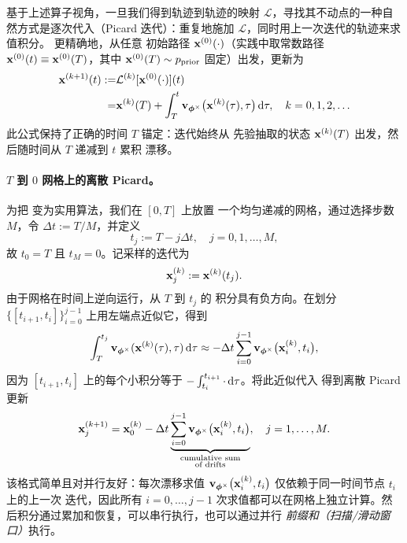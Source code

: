 基于上述算子视角，一旦我们得到轨迹到轨迹的映射
$\mathcal{L}$，寻找其不动点的一种自然方式是逐次代入（Picard 迭代）：重复地施加 $\mathcal{L}$，同时用上一次迭代的轨迹来求值积分。
更精确地，从任意
初始路径 ${\mathbf{x}}^{(0)}(\cdot)$（实践中取常数路径
${\mathbf{x}}^{(0)}(t)\equiv {\mathbf{x}}^{(0)}(T)$，其中 ${\mathbf{x}}^{(0)}(T)\sim p_{\mathrm{prior}}$ 固定）出发，更新为
\begin{align}\label{eq:picard_iter_T_to_t}
    \begin{aligned}
    {\mathbf{x}}^{(k+1)}(t)
    := &\mathcal{L}^{(k)}[{\mathbf{x}}^{(0)}(\cdot)](t)
    \\=
    &{\mathbf{x}}^{(k)}(T)
    +\int_{T}^{t}
    {\mathbf{v}}_{{\bm{\phi}}^\times} \big({\mathbf{x}}^{(k)}(\tau),\tau\big)\mathop{}\!\mathrm{d}\tau,
    \quad k=0,1,2,\ldots
    \end{aligned}
\end{align}
此公式保持了正确的时间 $T$ 锚定：迭代始终从
先验抽取的状态 ${\mathbf{x}}^{(k)}(T)$ 出发，然后随时间从 $T$ 递减到 $t$ 累积
漂移。

\paragraph{$T$ 到 $0$ 网格上的离散 Picard。}
为把  变为实用算法，我们在 $[0,T]$ 上放置
一个均匀递减的网格，通过选择步数 $M$，令
$\Delta t := T/M$，并定义
\[
t_j := T - j \Delta t,
\quad j=0,1,\ldots,M,
\]
故 $t_0=T$ 且 $t_M=0$。记采样的迭代为
\[
{\mathbf{x}}^{(k)}_j := {\mathbf{x}}^{(k)}(t_j).
\]
由于网格在时间上逆向运行，从 $T$ 到 $t_j$ 的
积分具有负方向。在划分 $\{[t_{i+1},t_i]\}_{i=0}^{j-1}$ 上用左端点近似它，得到
\[
\int_{T}^{t_j}{\mathbf{v}}_{{\bm{\phi}}^\times}({\mathbf{x}}^{(k)}(\tau), \tau) \mathop{}\!\mathrm{d}\tau
 \approx 
- \Delta t \sum_{i=0}^{j-1} {\mathbf{v}}_{{\bm{\phi}}^\times}\big({\mathbf{x}}^{(k)}_{i}, t_i\big),
\]
因为 $[t_{i+1},t_i]$ 上的每个小积分等于
$- \int_{t_i}^{t_{i+1}} \cdot\mathop{}\!\mathrm{d}\tau$。将此近似代入  得到离散 Picard 更新
\begin{equation}\label{eq:discrete_picard_decreasing}
    {\mathbf{x}}^{(k+1)}_j
    =
    {\mathbf{x}}^{(k)}_0
    - \Delta t 
    \underbrace{\sum_{i=0}^{j-1} {\mathbf{v}}_{{\bm{\phi}}^\times} \big({\mathbf{x}}^{(k)}_i, t_i\big)}_{
        \substack{\text{cumulative sum}\\ \text{of drifts}}
    },
    \quad j=1,\ldots,M.
\end{equation}
该格式简单且对并行友好：每次漂移求值
${\mathbf{v}}_{{\bm{\phi}}^\times} \big({\mathbf{x}}^{(k)}_i,t_i\big)$ 仅依赖于同一时间节点 $t_i$ 上的上一次
迭代，因此所有 $i=0,\dots,j - 1$ 次求值都可以在网格上独立计算。然后积分通过累加和恢复，可以串行执行，也可以通过并行
\emph{前缀和（扫描/滑动窗口）}执行。


